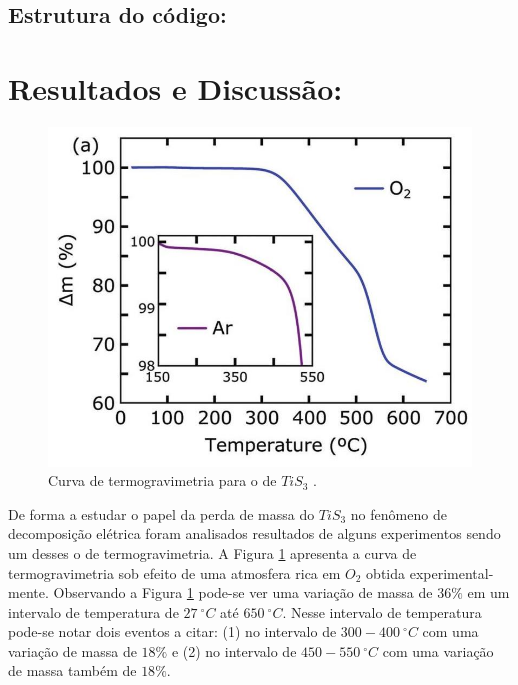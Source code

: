 \documentclass[11pt]{article}
\begin{document}
\subsection{Estrutura do código:}
\label{sec:org09fdbb7}



\section{Resultados e Discussão:}
\label{sec:org2482401}
\begin{figure}[!htbp]
\centering\includegraphics[scale=0.35]{figures/var-massa-temp.jpg}
\caption{Curva de termogravimetria para o  de $TiS_3$ .}
\label{f1}
\end{figure}

De forma a estudar o papel da perda de massa do \(TiS_3\) no fenômeno de decomposição elétrica foram analisados resultados de alguns experimentos sendo um desses o de termogravimetria. A Figura \ref{f1} apresenta a curva de termogravimetria sob efeito de uma atmosfera rica em \(O_2\) obtida experimental- \linebreak mente\cite{molina2017high}. Observando a Figura \ref{f1} pode-se ver uma variação de massa de \(36\%\) em um intervalo de temperatura de \(27~^\circ C\) até \(650~^\circ C\). Nesse intervalo de temperatura pode-se notar dois eventos a citar: (1) no intervalo de  \(300-400~^\circ C\) com uma variação de massa de \(18\%\) e (2) no intervalo de \(450-550~^\circ C\) com uma variação de massa também de \(18\%\).
\end{document}
